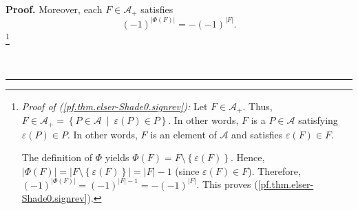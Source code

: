 \documentclass[numbers=enddot,12pt,final,onecolumn]{scrartcl}%
\theoremstyle{definition}
\newenvironment{proof}[1][Proof]{\noindent\textbf{#1.} }{\ \rule{0.5em}{0.5em}}
\newenvironment{verlong}{}{}
\begin{document}
\begin{verlong}
\begin{proof}
Moreover, each $F\in\mathcal{A}_{+}$ satisfies%
\begin{equation}
\left(  -1\right)  ^{\left\vert \Phi\left(  F\right)  \right\vert }=-\left(
-1\right)  ^{\left\vert F\right\vert }. \label{pf.thm.elser-Shade0.signrev}%
\end{equation}
\footnote{\textit{Proof of (\ref{pf.thm.elser-Shade0.signrev}):} Let
$F\in\mathcal{A}_{+}$. Thus, $F\in\mathcal{A}_{+}=\left\{  P\in\mathcal{A}%
\ \mid\ \varepsilon\left(  P\right)  \in P\right\}  $. In other words, $F$ is
a $P\in\mathcal{A}$ satisfying $\varepsilon\left(  P\right)  \in P$. In other
words, $F$ is an element of $\mathcal{A}$ and satisfies $\varepsilon\left(
F\right)  \in F$.
\par
The definition of $\Phi$ yields $\Phi\left(  F\right)  =F\setminus\left\{
\varepsilon\left(  F\right)  \right\}  $. Hence, $\left\vert \Phi\left(
F\right)  \right\vert =\left\vert F\setminus\left\{  \varepsilon\left(
F\right)  \right\}  \right\vert =\left\vert F\right\vert -1$ (since
$\varepsilon\left(  F\right)  \in F$). Therefore, $\left(  -1\right)
^{\left\vert \Phi\left(  F\right)  \right\vert }=\left(  -1\right)
^{\left\vert F\right\vert -1}=-\left(  -1\right)  ^{\left\vert F\right\vert }%
$. This proves (\ref{pf.thm.elser-Shade0.signrev}).}


\end{proof}
\end{verlong}
\end{document}
